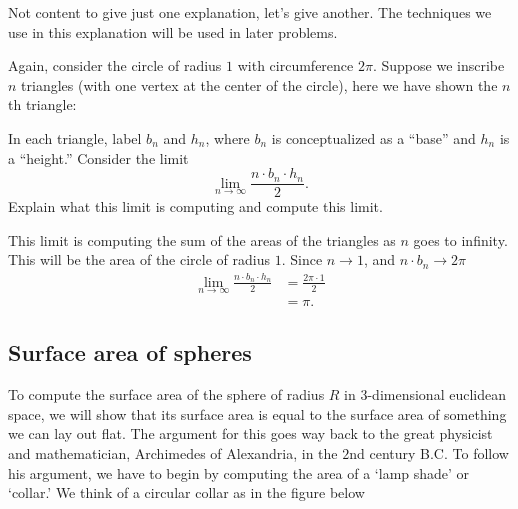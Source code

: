 \documentclass[hints,handout,noauthor,nooutcomes,12pt]{ximera}
\begin{document}
Not content to give just one explanation, let's give another. The
techniques we use in this explanation will be used in later problems.

\begin{problem}
Again, consider the circle of radius $1$ with circumference $2\pi$.
Suppose we inscribe $n$ triangles (with one vertex at the center of
the circle), here we have shown the $n$th triangle:
\begin{image}
\end{image}
In each triangle, label $b_n$ and $h_n$, where $b_n$ is conceptualized
as a ``base'' and $h_n$ is a ``height.''  Consider the limit
\[
\lim_{n\to\infty} \frac{n\cdot b_n\cdot h_n}{2}.
\]
Explain what this limit is computing and compute this limit.
\begin{freeResponse}
This limit is computing the sum of the areas of the triangles as $n$
goes to infinity. This will be the area of the circle of radius
$1$. Since $n\to 1$, and $n\cdot b_n\to 2\pi$
\begin{align*}
\lim_{n\to\infty} \frac{n\cdot b_n\cdot h_n}{2} &= \frac{2\pi\cdot 1}{2}\\
&=\pi.
\end{align*}
\end{freeResponse}
\end{problem}


\subsection{Surface area of spheres}

To compute the surface area of the sphere of radius $R$ in $3$-dimensional
euclidean space, we will show that its surface area is equal to the surface
area of something we can lay out flat. The argument for this goes way back to
the great physicist and mathematician, Archimedes of Alexandria, in the $2$nd
century B.C. To follow his argument, we have to begin by computing the area of
a `lamp shade' or `collar.' We think of a circular collar as in the figure
below
\end{document}
